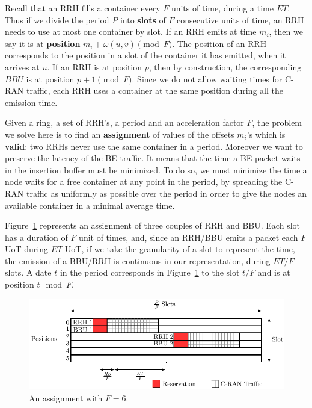 \documentclass[10pt, conference, letterpaper]{IEEEtran}
\begin{document}
Recall that an RRH fills a container every $F$ units of time, during a time $ET$. 
Thus if we divide the period $P$ into \textbf{slots} of $F$ consecutive units of time, an RRH needs to use at most one container by slot. If an RRH emits at time $m_i$, then we say it is at \textbf{position} $m_i + \omega(u,v)\pmod F$. 
The position of an RRH corresponds to the position in a slot of the container it has emitted, when it arrives at $u$. 
If an RRH is at position $p$, then by construction, the corresponding $BBU$ is at position $p+1\pmod F$. Since we do not allow waiting times for C-RAN traffic, each RRH uses a container at the same position during all the emission time. 

Given a ring, a set of RRH's, a period and an acceleration factor $F$, the problem we solve here is to find an \textbf{assignment} of values of the offsets $m_i$'s which is \textbf{valid}: two RRHs never use the same container in a period. Moreover we want to preserve the latency of the BE traffic. It means that the time a BE packet waits in the insertion buffer must be minimized. To do so, we must minimize the time a node waits for a free container at any point in the period, by spreading the C-RAN traffic as uniformly as possible over the period in order to give the nodes an available container in a minimal average time. 

Figure~\ref{fig:assignment} represents an assignment of three couples of RRH and BBU. Each slot has a duration of $F$ unit of times, and, since an RRH/BBU emits a packet each $F$ UoT during $ET$ UoT, if we take the granularity of a slot to represent the time, the emission of a BBU/RRH is continuous in our representation, during $ET/F$ slots. A date $t$ in the period corresponds in Figure~\ref{fig:assignment} to the slot $t/F$ and is at position $t \mod F$.


\begin{figure}[h!]
\begin{center}   

      \includegraphics[scale=0.65]{assignment}
     \caption{An assignment with $F = 6$.}\label{fig:assignment}
     
\end{center}
  \end{figure}
\end{document}
